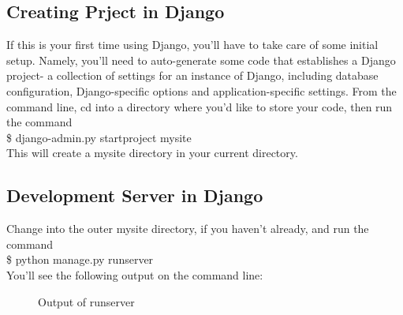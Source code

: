 \subsection{Creating Prject in Django}
If this is your first time using Django, you'll have to take care of 
some initial setup. Namely, you'll need to auto-generate some code that 
establishes a Django project- a collection of settings for an instance 
of Django, including database configuration, Django-specific options 
and application-specific settings. From the command line, cd into a 
directory where you'd like to store your code, then run the command \\

	\$ django-admin.py startproject mysite \\

\noindent This will create a mysite directory in your current
directory.


\subsection{Development Server in Django}  Change into 
the outer mysite directory, if you haven't already, and run the command\\
	
	\$ python manage.py runserver\\

You'll see the following output on the command line:\\

\begin{figure}[h]
\caption{Output of runserver}
\end{figure}

